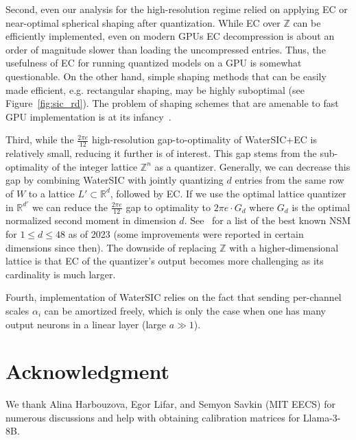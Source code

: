 \documentclass[journal]{IEEEtran}
\newcommand{\ZZ}{\mathbb{Z}}
\newcommand{\RR}{\mathbb{R}}
\begin{document}
Second, even our analysis for the high-resolution regime relied on applying EC or near-optimal
    spherical shaping after quantization. While EC over $\ZZ$ can be efficiently implemented, even
    on modern GPUs EC decompression is about an order of magnitude slower than loading the
    uncompressed entries. Thus, the usefulness of EC for running quantized models on a GPU is
    somewhat questionable. On the other hand, simple shaping methods that can be easily made
    efficient, e.g. rectangular shaping, may be highly suboptimal (see Figure~\ref{fig:sic_rd}).
    The problem of shaping schemes that are amenable to fast GPU implementation is at its infancy~\cite{NestQuant}.

Third, while the $\frac{2\pi e}{12}$ high-resolution gap-to-optimality of WaterSIC+EC is relatively small, reducing it further is of interest. This gap stems from the sub-optimality of the integer lattice $\ZZ^n$ as a quantizer. Generally, we can decrease this gap by combining WaterSIC with jointly quantizing $d$ entries from the same row of $W$ to a lattice $L'\subset\RR^d$, followed by EC. If we use the optimal lattice quantizer in $\RR^{d'}$ we can reduce the $\frac{2\pi e}{12}$ gap to optimality to $2\pi e \cdot G_d$ where $G_d$ is the optimal normalized second moment in dimension $d$. See~\cite[Table I]{AgrellAllen22} for a list of the best known NSM for $1\leq d\leq 48$ as of 2023 (some improvements were reported in certain dimensions since then). The downside of replacing $\ZZ$ with a higher-dimensional lattice is that EC of the quantizer's output becomes more challenging as its cardinality is much larger.

Fourth, implementation of WaterSIC relies on the fact that sending per-channel scales $\alpha_i$
can be amortized freely, which is only the case when one has many output neurons in a linear
layer (large $a \gg 1$).


\section*{Acknowledgment}
We thank Alina Harbouzova, Egor Lifar, and Semyon Savkin (MIT EECS) for numerous discussions and help with obtaining calibration matrices for Llama-3-8B.



\end{document}

